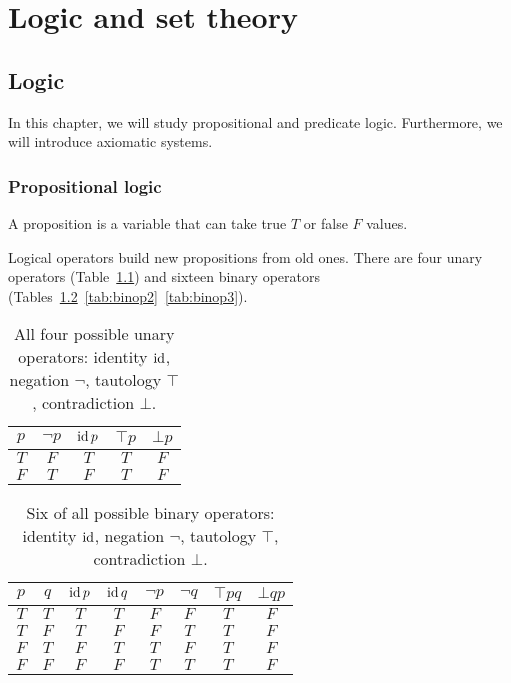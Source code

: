 \part{Logic and set theory}

\chapter{Logic}

    In this chapter, we will study propositional and predicate logic. Furthermore, we will introduce axiomatic systems.

\section{Propositional logic}

    \begin{definition}
        A proposition is a variable that can take true $T$ or false $F$ values.
    \end{definition}

    \noindent Logical operators build new propositions from old ones. There are four unary operators (Table~\ref{tab:unop}) and sixteen binary operators (Tables~\ref{tab:binop}~\ref{tab:binop2}~\ref{tab:binop3}). 

    \begin{table}[h!]
        \centering
        \begin{tabular}{c || c | c | c | c}
            $p$ & $\lnot p$ & $\operatorname{id} p$ & $\top p$ & $\bot p$ \\
            \hline
            \hline
            $T$ & $F$ & $T$ & $T$ & $F$ \\
            $F$ & $T$ & $F$ & $T$ & $F$ \\
        \end{tabular}
        \caption{All four possible unary operators: identity $\operatorname{id}$, negation $\lnot$, tautology $\top$, contradiction $\bot$.}
        \label{tab:unop}
    \end{table}

    \begin{table}[h!]
        \centering
        \begin{tabular}{c | c || c | c | c | c | c | c }
            $p$ & $q$ & $\operatorname{id} p$ & $\operatorname{id} q$ & $\neg p$ & $\neg q$ & $\top pq$ & $\bot qp$ \\
            \hline
            \hline
            $T$ & $T$ & $T$ & $T$ & $F$ & $F$ & $T$ & $F$ \\
            $T$ & $F$ & $T$ & $F$ & $F$ & $T$ & $T$ & $F$ \\
            $F$ & $T$ & $F$ & $T$ & $T$ & $F$ & $T$ & $F$ \\
            $F$ & $F$ & $F$ & $F$ & $T$ & $T$ & $T$ & $F$ \\
        \end{tabular}
        \caption{Six of all possible binary operators: identity $\operatorname{id}$, negation $\lnot$, tautology $\top$, contradiction $\bot$. }
        \label{tab:binop}
    \end{table}

